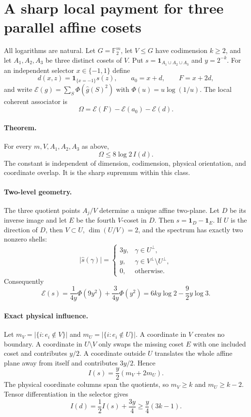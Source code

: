 \section*{A sharp local payment for three parallel affine cosets}

All logarithms are natural.  Let $G=\mathbb F_2^m$, let $V\leq G$ have
codimension $k\geq2$, and let $A_1,A_2,A_3$ be three distinct cosets of
$V$.  Put $s=\mathbf1_{A_1\cup A_2\cup A_3}$ and $y=2^{-k}$.  For an
independent selector $x\in\{-1,1\}$ define
\[
 d(x,z)=\mathbf1_{\{x=-1\}}s(z),\qquad a_0=x+d,\qquad F=x+2d,
\]
and write $\mathcal E(g)=\sum_S\Phi(\widehat g(S)^2)$ with
$\Phi(u)=u\log(1/u)$.  The local coherent associator is
\[
 \Omega=\mathcal E(F)-\mathcal E(a_0)-\mathcal E(d).
\]

\paragraph{Theorem.}  For every $m,V,A_1,A_2,A_3$ as above,
\[
 \boxed{\Omega\leq 8\log2\,I(d).}
\]
The constant is independent of dimension, codimension, physical orientation,
and coordinate overlap.  It is the sharp supremum within this class.

\paragraph{Two-level geometry.}
The three quotient points $A_j/V$ determine a unique affine two-plane.  Let
$D$ be its inverse image and let $E$ be the fourth $V$-coset in $D$.  Then
$s=\mathbf1_D-\mathbf1_E$.  If $U$ is the direction of $D$, then
$V\subset U$, $\dim(U/V)=2$, and the spectrum has exactly two nonzero shells:
\[
 |\widehat s(\gamma)|=
 \begin{cases}
 3y,&\gamma\in U^\perp,\\
 y,&\gamma\in V^\perp\setminus U^\perp,\\
 0,&\text{otherwise}.
 \end{cases}
\]
Consequently
\[
 \mathcal E(s)
 =\frac1{4y}\Phi(9y^2)+\frac3{4y}\Phi(y^2)
 =6ky\log2-\frac92y\log3.                         \tag{1}
\]

\paragraph{Exact physical influence.}
Let $m_V=|\{i:e_i\notin V\}|$ and
$m_U=|\{i:e_i\notin U\}|$.  A coordinate in $V$ creates no boundary.  A
coordinate in $U\setminus V$ only swaps the missing coset $E$ with one
included coset and contributes $y/2$.  A coordinate outside $U$ translates
the whole affine plane away from itself and contributes $3y/2$.  Hence
\[
 I(s)=\frac y2(m_V+2m_U).                              \tag{2}
\]
The physical coordinate columns span the quotients, so
$m_V\geq k$ and $m_U\geq k-2$.  Tensor differentiation in the selector gives
\[
 I(d)=\frac12I(s)+\frac{3y}{4}
 \geq\frac y4(3k-1).                                  \tag{3}
\]

